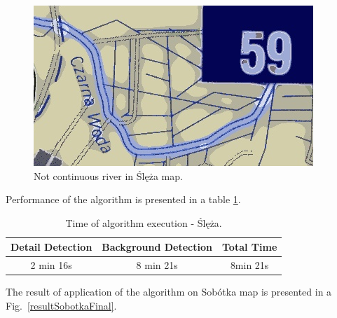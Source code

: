 \documentclass[a4paper,onecolumn,oneside,12pt]{memoir}
\begin{document}
\begin{figure}[!ht]
\begin{center}
\includegraphics[scale=0.5]{images/slezaRozlanyTekst.png}
\caption{Not continuous river in Ślęża map.}
\label{slezaRiver}
\end{center}
\end{figure}

Performance of the algorithm is presented in a table \ref{slezaPerformance}.

\begin{table}[!ht]
\begin{center}
\caption{Time of algorithm execution - Ślęża.}
\label{slezaPerformance}
\begin{tabular}{|c|c|c|}
  \hline
  Detail Detection & Background Detection & Total Time \\
  \hline
  2 min 16s & 8 min 21s & 8min 21s \\
  \hline
\end{tabular}
\end{center}
\end{table}

The result of application of the algorithm on Sobótka map is presented in a
Fig.~\ref{resultSobotkaFinal}.
\end{document}
